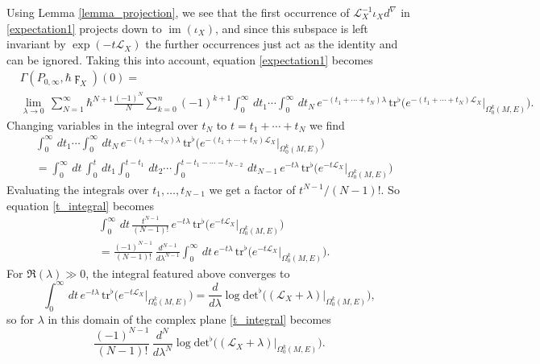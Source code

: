 \documentclass[reqno]{amsart}
\theoremstyle{definition}
\theoremstyle{remark}
\renewcommand{\d}{d^\nabla}
\newcommand{\h}{\hbar}
\renewcommand{\L}{\mathcal{L}}
\newcommand{\tr}{\mathrm{tr}^\flat}
\renewcommand{\det}{\mathrm{det}^\flat}
\DeclareMathOperator{\im}{im}
\begin{document}
Using Lemma \ref{lemma_projection}, we see that the first occurrence of $\L_X^{-1}\iota_X\d$ in \eqref{expectation1} projects down to $\im(\iota_X)$, and since this subspace is left invariant by $\exp(-t\L_X)$ the further occurrences just act as the identity and can be ignored. Taking this into account, equation \eqref{expectation1} becomes
\begin{equation}
\label{expectation}
\begin{split}
    &\Gamma(P_{0,\infty}, \h \digamma_X)(0) = \\
    &\lim_{\lambda\to 0}\, \sum_{N=1}^\infty \h^{N+1}\frac{(-1)^N}{N}\sum_{k=0}^n (-1)^{k+1} \int_0^\infty\,dt_1\cdots\int_0^\infty\,dt_N\, e^{-(t_1+\cdots +t_N)\lambda}\, \tr\big(e^{-(t_1+\cdots+t_N)\L_X}\big|_{\Omega_0^k(M,E)}\big).
\end{split}
\end{equation}
Changing variables in the integral over $t_N$ to $t = t_1+\cdots+t_N$ we find
\begin{equation}
\begin{split}
\label{t_integral}
    &\int_0^\infty\,dt_1\cdots\int_0^\infty\,dt_N\,e^{-(t_1+\cdots t_N)\lambda}\, \tr\big(e^{-(t_1+\cdots+t_N)\L_X}\big|_{\Omega_0^k(M,E)}\big) \\
    &= \int_0^\infty\,dt\,\int_0^t\,dt_1\int_0^{t-t_1}\,dt_2 \cdots \int_0^{t-t_1-\cdots-t_{N-2}}\,dt_{N-1}\,e^{-t\lambda}\,\tr\big(e^{-t\L_X}\big|_{\Omega_0^k(M,E)}\big)
\end{split}
\end{equation}
Evaluating the integrals over $t_1,\dots,t_{N-1}$ we get a factor of $t^{N-1}/(N-1)!$. So equation \eqref{t_integral} becomes
\begin{equation*}
\begin{split}
    &\int_0^\infty\,dt\,\frac{t^{N-1}}{(N-1)!}\, e^{-t\lambda}\,\tr\big(e^{-t\L_X}\big|_{\Omega_0^k(M,E)}\big) \\
    &= \frac{(-1)^{N-1}}{(N-1)!}\,\frac{d^{N-1}}{d\lambda^{N-1}}\int_0^\infty\,dt\, e^{-t\lambda}\,\tr\big(e^{-t\L_X}\big|_{\Omega_0^k(M,E)}\big).
\end{split}
\end{equation*}
For $\Re(\lambda) \gg 0$, the integral featured above converges to
$$\int_0^\infty\,dt\, e^{-t\lambda}\,\tr\big(e^{-t\L_X}\big|_{\Omega_0^k(M,E)}\big) = \frac{d}{d\lambda}\log\det\big((\L_X+\lambda)|_{\Omega_0^k(M,E)}\big) ,$$
so for $\lambda$ in this domain of the complex plane \eqref{t_integral} becomes
$$\frac{(-1)^{N-1}}{(N-1)!}\,\frac{d^N}{d\lambda^N}\log\det\big((\L_X+\lambda)|_{\Omega_0^k(M,E)}\big) .$$
\end{document}
